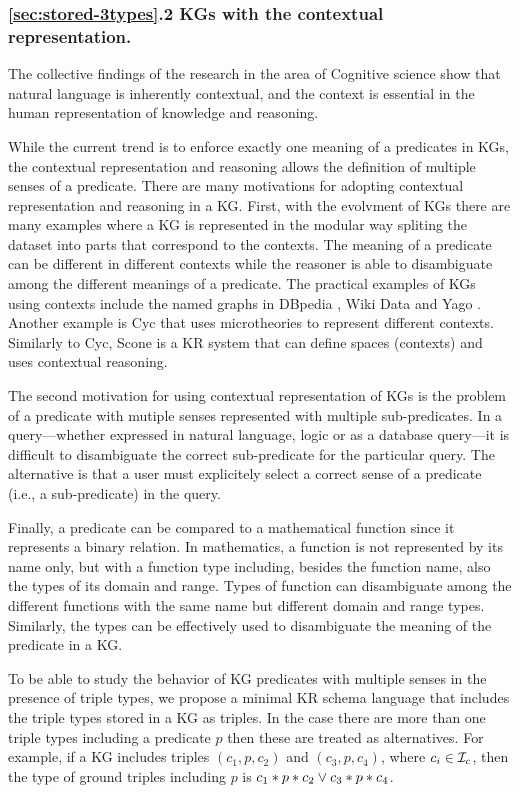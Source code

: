 \documentclass[runningheads]{llncs}
\newcommand{\I}{{\cal I}}
\begin{document}
\subsubsection{\ref{sec:stored-3types}.2 KGs with the contextual representation.}

The collective findings of the research in the area of Cognitive
science \cite{Hollister2017} show that natural language is inherently
contextual, and the context is essential in the human representation
of knowledge and reasoning. 

While the current trend is to enforce exactly one meaning of a
predicates in KGs, the contextual representation and reasoning allows
the definition of multiple senses of a predicate. There are many
motivations for adopting contextual representation and reasoning in a
KG. First, with the evolvment of KGs there are many examples where a
KG is represented in the modular way spliting the dataset into parts
that correspond to the contexts. The meaning of a predicate can be
different in different contexts while the reasoner is able to
disambiguate among the different meanings of a predicate.
The practical examples of KGs using contexts include the named graphs
in DBpedia \cite{Auer2007}, Wiki Data \cite{vrandecic2014} and Yago
\cite{Hoffart2013}. Another example is Cyc \cite{cyc} that uses
microtheories to represent different contexts. Similarly to Cyc, Scone
\cite{Fahlman2011} is a KR system that can define spaces (contexts)
and uses contextual reasoning.

The second motivation for using contextual representation of KGs is
the problem of a predicate with mutiple senses represented with
multiple sub-predicates. In a query---whether expressed in natural
language, logic or as a database query---it is difficult to
disambiguate the correct sub-predicate for the particular query. The
alternative is that a user must explicitely select a correct sense of
a predicate (i.e., a sub-predicate) in the query.

Finally, a predicate can be compared to a mathematical function since
it represents a binary relation. In mathematics, a function is not
represented by its name only, but with a function type including,
besides the function name, also the types of its domain and
range. Types of function can disambiguate among the different
functions with the same name but different domain and range
types. Similarly, the types can be effectively used to disambiguate
the meaning of the predicate in a KG.

To be able to study the behavior of KG predicates with multiple senses
in the presence of triple types, we propose a minimal KR schema
language that includes the triple types stored in a KG as triples. In
the case there are more than one triple types including a predicate
$p$ then these are treated as alternatives. For example, if a KG
includes triples $(c_1,p,c_2)$ and $(c_3,p,c_4)$, where $c_i\in\I_c$,
then the type of ground triples including $p$ is
$c_1*p*c_2\lor\/c_3*p*c_4$.
\end{document}
